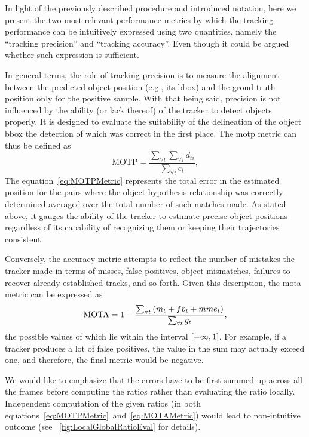 In light of the previously described procedure and introduced notation, here we present the two most relevant performance metrics by which the tracking performance can be intuitively expressed using two quantities, namely the ``tracking precision'' and ``tracking accuracy''. Even though it could be argued whether such expression is sufficient.

In general terms, the role of tracking precision is to measure the alignment between the predicted object position (e.g., its \gls{bbox}) and the groud-truth position only for the positive sample. With that being said, precision is not influenced by the ability (or lack thereof) of the tracker to detect objects properly. It is designed to evaluate the suitability of the delineation of the object \gls{bbox} the detection of which was correct in the first place. The \gls{motp} metric can thus be defined as
\begin{equation}
    \label{eq:MOTPMetric}
    \text{MOTP} = \frac{\sum_{\forall t} \sum_{\forall i} d_{ti}}{\sum_{\forall t} c_t},
\end{equation}
The equation~\ref{eq:MOTPMetric} represents the total error in the estimated position for the pairs where the object-hypothesis relationship was correctly determined averaged over the total number of such matches made. As stated above, it gauges the ability of the tracker to estimate precise object positions regardless of its capability of recognizing them or keeping their trajectories consistent.

Conversely, the accuracy metric attempts to reflect the number of mistakes the tracker made in terms of misses, false positives, object mismatches, failures to recover already established tracks, and so forth. Given this description, the \gls{mota} metric can be expressed as
\begin{equation}
    \label{eq:MOTAMetric}
    \text{MOTA} = 1 - \frac{\sum_{\forall t} \left( {m_t + fp_t + mme_t} \right)}{\sum_{\forall t} g_t},
\end{equation}
the possible values of which lie within the interval $\left[ {-\infty, 1} \right]$. For example, if a tracker produces a lot of false positives, the value in the sum may actually exceed one, and therefore, the final metric would be negative.

We would like to emphasize that the errors have to be first summed up across all the frames before computing the ratios rather than evaluating the ratio locally. Independent computation of the given ratios (in both equations~\ref{eq:MOTPMetric}~and~\ref{eq:MOTAMetric}) would lead to non-intuitive outcome (see \figstr{}~\ref{fig:LocalGlobalRatioEval} for details).

